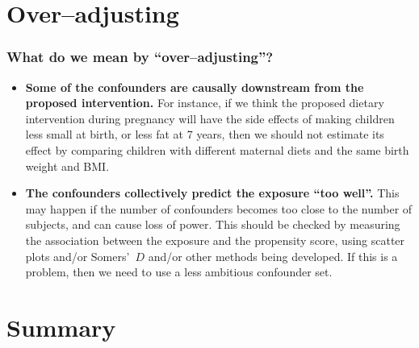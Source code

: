 \documentclass[11pt]{beamer}
\begin{document}
\section{Over--adjusting}

\begin{frame}
\frametitle{What do we mean by ``over--adjusting''?}


\begin{itemize}

\item<3-> \textbf{Some of the confounders are causally downstream from the proposed intervention.}
For instance, if we think the proposed dietary intervention during pregnancy will have the side effects
of making children less small at birth, or less fat at 7 years,
then we should not estimate its effect by comparing children with different maternal diets
and the same birth weight and BMI.

\item<4-> \textbf{The confounders collectively predict the exposure ``too well''.}
This may happen if the number of confounders becomes too close to the number of subjects,
and can cause loss of power.
This should be checked by measuring the association between the exposure and the propensity score,
using scatter plots and/or Somers'~$D$ and/or other methods being developed.
If this is a problem, then we need to use a less ambitious confounder set.

\end{itemize}

\end{frame}

\section{Summary}
\end{document}
